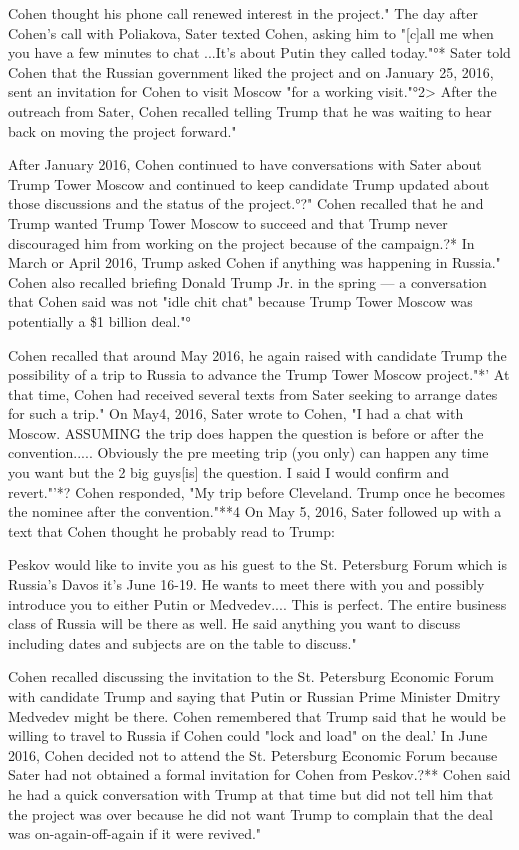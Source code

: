 Cohen thought his phone call renewed interest in the project."
The day after Cohen's call with Poliakova, Sater texted Cohen, asking him to "[c]all me when you have a few minutes to chat ...It's about Putin they called today."°*
Sater told Cohen that the Russian government liked the project and on January 25, 2016, sent an invitation for Cohen to visit Moscow "for a working visit."°2>
After the outreach from Sater, Cohen recalled telling Trump that he was waiting to hear back on moving the project forward."

After January 2016, Cohen continued to have conversations with Sater about Trump Tower Moscow and continued to keep candidate Trump updated about those discussions and the status of the project.°?"
Cohen recalled that he and Trump wanted Trump Tower Moscow to succeed and that Trump never discouraged him from working on the project because of the campaign.?*
In March or April 2016, Trump asked Cohen if anything was happening in Russia."
Cohen also recalled briefing Donald Trump Jr. in the spring — a conversation that Cohen said was not "idle chit chat" because Trump Tower Moscow was potentially a \$1 billion deal."°

Cohen recalled that around May 2016, he again raised with candidate Trump the possibility of a trip to Russia to advance the Trump Tower Moscow project."*'
At that time, Cohen had received several texts from Sater seeking to arrange dates for such a trip."
On May4, 2016, Sater wrote to Cohen, "I had a chat with Moscow.
ASSUMING the trip does happen the question is before or after the convention.....
Obviously the pre meeting trip (you only) can happen any time you want but the 2 big guys[is] the question.
I said I would confirm and revert."'*?
Cohen responded, "My trip before Cleveland.
Trump once he becomes the nominee after the convention."**4
On May 5, 2016, Sater followed up with a text that Cohen thought he probably read to Trump:

Peskov would like to invite you as his guest to the St. Petersburg Forum which is Russia's Davos it's June 16-19.
He wants to meet there with you and possibly introduce you to either Putin or Medvedev....
This is perfect.
The entire business class of Russia will be there as well.
He said anything you want to discuss including dates and subjects are on the table to discuss."

Cohen recalled discussing the invitation to the St. Petersburg Economic Forum with candidate Trump and saying that Putin or Russian Prime Minister Dmitry Medvedev might be there.
Cohen remembered that Trump said that he would be willing to travel to Russia if Cohen could "lock and load" on the deal.'
In June 2016, Cohen decided not to attend the St. Petersburg Economic Forum because Sater had not obtained a formal invitation for Cohen from Peskov.?**
Cohen said he had a quick conversation with Trump at that time but did not tell him that the project was over because he did not want Trump to complain that the deal was on-again-off-again if it were revived."


